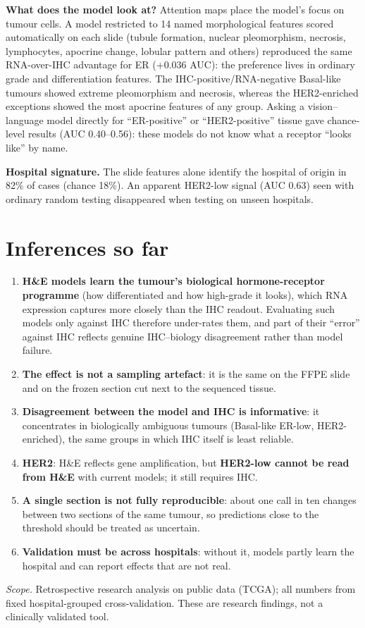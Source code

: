 \documentclass[10pt,a4paper]{article}
\begin{document}
\textbf{What does the model look at?} Attention maps place the model's focus on tumour cells. A model restricted to 14
named morphological features scored automatically on each slide (tubule formation, nuclear pleomorphism, necrosis,
lymphocytes, apocrine change, lobular pattern and others) reproduced the same RNA-over-IHC advantage for ER (+0.036 AUC):
the preference lives in ordinary grade and differentiation features. The IHC-positive/RNA-negative Basal-like tumours
showed extreme pleomorphism and necrosis, whereas the HER2-enriched exceptions showed the most apocrine features of any
group. Asking a vision--language model directly for ``ER-positive'' or ``HER2-positive'' tissue gave chance-level results
(AUC 0.40--0.56): these models do not know what a receptor ``looks like'' by name.

\textbf{Hospital signature.} The slide features alone identify the hospital of origin in 82\% of cases (chance 18\%).
An apparent HER2-low signal (AUC 0.63) seen with ordinary random testing disappeared when testing on unseen hospitals.

\section{Inferences so far}

\begin{enumerate}
  \item \textbf{H\&E models learn the tumour's biological hormone-receptor programme} (how differentiated and how
        high-grade it looks), which RNA expression captures more closely than the IHC readout. Evaluating such models
        only against IHC therefore under-rates them, and part of their ``error'' against IHC reflects genuine
        IHC--biology disagreement rather than model failure.
  \item \textbf{The effect is not a sampling artefact}: it is the same on the FFPE slide and on the frozen section cut
        next to the sequenced tissue.
  \item \textbf{Disagreement between the model and IHC is informative}: it concentrates in biologically ambiguous
        tumours (Basal-like ER-low, HER2-enriched), the same groups in which IHC itself is least reliable.
  \item \textbf{HER2}: H\&E reflects gene amplification, but \textbf{HER2-low cannot be read from H\&E} with current
        models; it still requires IHC.
  \item \textbf{A single section is not fully reproducible}: about one call in ten changes between two sections of the
        same tumour, so predictions close to the threshold should be treated as uncertain.
  \item \textbf{Validation must be across hospitals}: without it, models partly learn the hospital and can report
        effects that are not real.
\end{enumerate}

{\small\textit{Scope.} Retrospective research analysis on public data (TCGA); all numbers from fixed hospital-grouped
cross-validation. These are research findings, not a clinically validated tool.}
\end{document}
